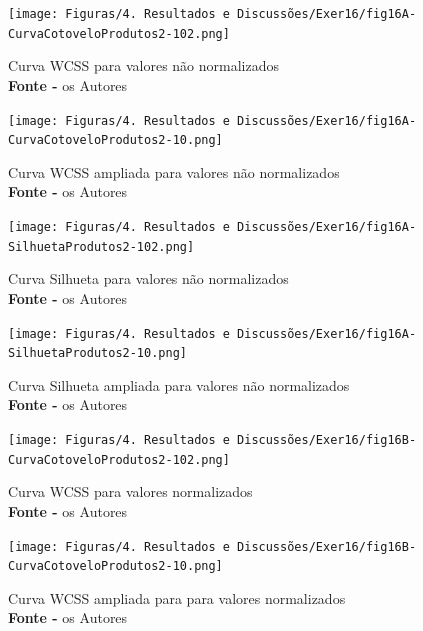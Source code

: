 \begin{figure}[H]
    \centering
    \texttt{[image: Figuras/4. Resultados e Discussões/Exer16/fig16A-CurvaCotoveloProdutos2-102.png]}
    \caption{Curva WCSS para valores não normalizados\\ \textbf{Fonte -} os Autores}
    \label{fig: fig16A-CurvaCotoveloProdutos2-102.png}
\end{figure}

\begin{figure}[H]
    \centering
    \texttt{[image: Figuras/4. Resultados e Discussões/Exer16/fig16A-CurvaCotoveloProdutos2-10.png]}
    \caption{Curva WCSS ampliada para valores não normalizados\\ \textbf{Fonte -} os Autores}
    \label{fig: fig16A-CurvaCotoveloProdutos2-10.png}
\end{figure}

\begin{figure}[H]
    \centering
    \texttt{[image: Figuras/4. Resultados e Discussões/Exer16/fig16A-SilhuetaProdutos2-102.png]}
    \caption{Curva Silhueta para valores não normalizados\\ \textbf{Fonte -} os Autores}
    \label{fig: fig16A-SilhuetaProdutos2-102.png}
\end{figure}

\begin{figure}[H]
    \centering
    \texttt{[image: Figuras/4. Resultados e Discussões/Exer16/fig16A-SilhuetaProdutos2-10.png]}
    \caption{Curva Silhueta ampliada para valores não normalizados\\ \textbf{Fonte -} os Autores}
    \label{fig: fig16A-SilhuetaProdutos2-10.png}
\end{figure}


\begin{figure}[H]
    \centering
    \texttt{[image: Figuras/4. Resultados e Discussões/Exer16/fig16B-CurvaCotoveloProdutos2-102.png]}
    \caption{Curva WCSS para valores normalizados\\ \textbf{Fonte -} os Autores}
    \label{fig: Matriz de dispersão colorida por variedade de trigo.}
\end{figure}

\begin{figure}[H]
    \centering
    \texttt{[image: Figuras/4. Resultados e Discussões/Exer16/fig16B-CurvaCotoveloProdutos2-10.png]}
    \caption{Curva WCSS ampliada para para valores normalizados\\ \textbf{Fonte -} os Autores}
    \label{fig: Matriz de dispersão colorida por variedade de trigo.}
\end{figure}

